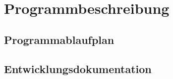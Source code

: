 \chapter{Programmbeschreibung}\label{ch:programmbeschreibung}

\section{Programmablaufplan}\label{sec:pap}

\section{Entwicklungsdokumentation}\label{sec:entwicklerdokumentation}
